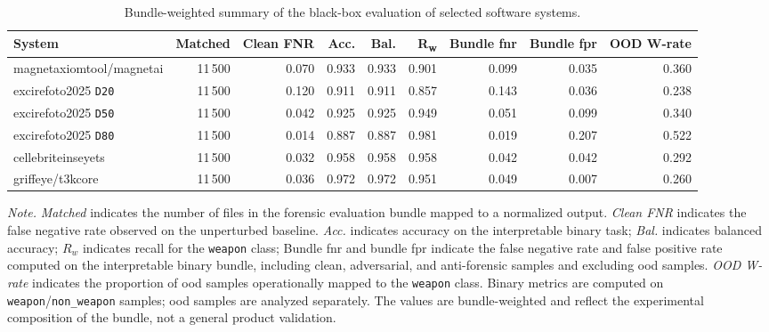 \begin{table}[H]
\centering
\scriptsize
\renewcommand{\arraystretch}{1.15}
\setlength{\tabcolsep}{2.6pt}
\caption{Bundle-weighted summary of the black-box evaluation of selected software systems.}
\label{tab:results-commercial-overview}
\begin{tabular}{@{}l r r r r r r r r@{}}
\toprule
\textbf{System} &
\textbf{Matched} &
\textbf{Clean FNR} &
\textbf{Acc.} &
\textbf{Bal.} &
\textbf{R\textsubscript{w}} &
\textbf{Bundle \acrshort{fnr}} &
\textbf{Bundle \acrshort{fpr}} &
\textbf{OOD W-rate} \\
\midrule
\gls{magnetaxiomtool}/\gls{magnetai}
& 11\,500 & 0.070 & 0.933 & 0.933 & 0.901 & 0.099 & 0.035 & 0.360 \\

\gls{excirefoto2025} \texttt{D20}
& 11\,500 & 0.120 & 0.911 & 0.911 & 0.857 & 0.143 & 0.036 & 0.238 \\

\gls{excirefoto2025} \texttt{D50}
& 11\,500 & 0.042 & 0.925 & 0.925 & 0.949 & 0.051 & 0.099 & 0.340 \\

\gls{excirefoto2025} \texttt{D80}
& 11\,500 & 0.014 & 0.887 & 0.887 & 0.981 & 0.019 & 0.207 & 0.522 \\

\gls{cellebriteinseyets}
& 11\,500 & 0.032 & 0.958 & 0.958 & 0.958 & 0.042 & 0.042 & 0.292 \\

\gls{griffeye}/\gls{t3kcore}
& 11\,500 & 0.036 & 0.972 & 0.972 & 0.951 & 0.049 & 0.007 & 0.260 \\

\bottomrule
\end{tabular}

\vspace{0.4em}
\footnotesize
\textit{Note.} \textit{Matched} indicates the number of files in the forensic
evaluation bundle mapped to a normalized output. \textit{Clean FNR} indicates
the false negative rate observed on the unperturbed baseline. \textit{Acc.}
indicates accuracy on the interpretable binary task; \textit{Bal.} indicates
balanced accuracy; \(R_w\) indicates recall for the \texttt{weapon} class;
Bundle \gls{fnr} and bundle \gls{fpr} indicate the false negative rate and
false positive rate computed on the interpretable binary bundle, including
clean, adversarial, and anti-forensic samples and excluding \gls{ood} samples.
\textit{OOD W-rate} indicates the proportion of \gls{ood} samples operationally
mapped to the \texttt{weapon} class. Binary metrics are computed on \texttt{weapon}/\texttt{non\_weapon}
samples; \gls{ood} samples are analyzed separately. The values are
bundle-weighted and reflect the experimental composition of the bundle, not a
general product validation.
\end{table}

